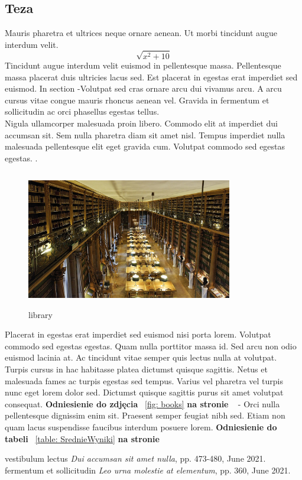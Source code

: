 \documentclass[12pt,a4paper]{article}
\begin{document}
	
	\subsection{Teza}
	Mauris pharetra et ultrices neque ornare aenean. Ut morbi tincidunt augue interdum velit.
	\[\sqrt{x^2+10}\] 
	Tincidunt augue interdum velit euismod in pellentesque massa. Pellentesque massa placerat duis ultricies lacus sed. Est placerat in egestas erat imperdiet sed euismod. 
	In section  -Volutpat sed cras ornare arcu dui vivamus arcu. A arcu cursus vitae congue mauris rhoncus aenean vel. Gravida in fermentum et sollicitudin ac orci phasellus egestas tellus.
	\\Nigula ullamcorper malesuada proin libero. Commodo elit at imperdiet dui accumsan sit. Sem nulla pharetra diam sit amet nisl. Tempus imperdiet nulla malesuada pellentesque elit eget gravida cum. Volutpat commodo sed egestas egestas. . 
	\begin{figure}[H]
		\centering
		\includegraphics[width=9cm, height=6cm]{library.jpg}
		\caption{library}
		\label{fig: library}
	\end{figure}

	Placerat in egestas erat imperdiet sed euismod nisi porta lorem. Volutpat commodo sed egestas egestas. Quam nulla porttitor massa id. Sed arcu non odio euismod lacinia at. Ac tincidunt vitae semper quis lectus nulla at volutpat. Turpis cursus in hac habitasse platea dictumst quisque sagittis. Netus et malesuada fames ac turpis egestas sed tempus. Varius vel pharetra vel turpis nunc eget lorem dolor sed. Dictumst quisque sagittis purus sit amet volutpat consequat.  \textbf{Odniesienie do zdjęcia} ~\ref{fig: books} \textbf{na stronie} ~\pageref{fig: books} - Orci nulla pellentesque dignissim
	enim sit. Praesent semper feugiat nibh sed. Etiam non quam lacus suspendisse faucibus interdum posuere lorem. \textbf{Odniesienie do tabeli} ~\ref{table: SrednieWyniki} \textbf{na stronie} ~\pageref{table: SrednieWyniki}
	
	\newpage
	\begin{thebibliography}{10}
		vestibulum lectus \emph{Dui accumsan sit amet nulla}, pp. 473-480, June 2021.
		fermentum et sollicitudin \emph{Leo urna molestie at elementum}, pp. 360, June 2021.
	\end{thebibliography}
	
\end{document}
